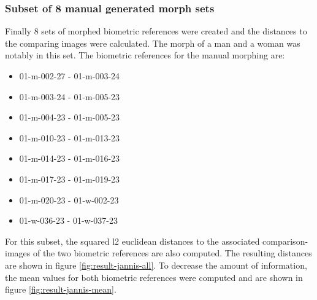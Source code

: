 \newpage
\subsubsection{Subset of 8 manual generated morph sets}
\label{sec:subsetman}
Finally 8 sets of morphed biometric references were created and the distances to the comparing images were calculated. The morph of a man and a woman was notably in this set.
The biometric references for the manual morphing are:
\begin{multicols}{2}
\begin{itemize}
\item 01-m-002-27 - 01-m-003-24
\item 01-m-003-24 - 01-m-005-23
\item 01-m-004-23 - 01-m-005-23
\item 01-m-010-23 - 01-m-013-23
\item 01-m-014-23 - 01-m-016-23
\item 01-m-017-23 - 01-m-019-23
\item 01-m-020-23 - 01-w-002-23
\item 01-w-036-23 - 01-w-037-23
\end{itemize}
\end{multicols}
For this subset, the squared l2 euclidean distances to the associated comparison-images of the two biometric references are also computed. The resulting distances are shown in figure \ref{fig:result-jannis-all}. To decrease the amount of information, the mean values for both biometric references were computed and are shown in figure \ref{fig:result-jannis-mean}.

